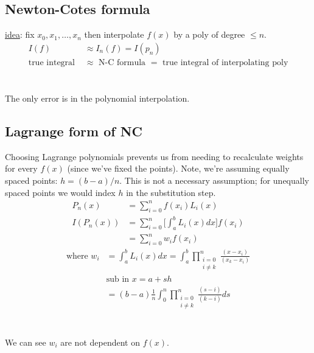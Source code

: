\documentclass[12pt]{exam}
\begin{document}
 
\subsection*{Newton-Cotes formula}
 
\underline{idea}: fix $x_0, x_1, \dots, x_n$ then interpolate $f(x)$ by a poly of degree $\leq n$.
%
\ifprintanswers
\begin{align*}
I(f) &\approx I_n(f) = I(p_n)\\
\text{true integral } &\approx \text{ N-C formula } = \text{ true integral of interpolating poly}
\end{align*}
\else
\\\vspace*{2em}\\
\fi
%
The only error is in the polynomial interpolation.

\subsection*{Lagrange form of NC}
Choosing Lagrange polynomials prevents us from needing to recalculate weights for every $f(x)$ (since we've fixed the points). Note, we're assuming equally spaced points: $h = (b-a)/n$. This is not a necessary assumption; for unequally spaced points we would index $h$ in the substitution step.
%
\begin{align*}
P_n(x) &= \sum_{i=0}^{n}f(x_i)L_i(x) \\
%
I(P_n(x)) &= \sum_{i=0}^{n} \bigl[ \int_a^b L_i(x)dx \bigr] f(x_i) \\
%
&= \sum_{i=0}^{n} w_i f(x_i)
\end{align*}
\ifprintanswers
\begin{align*}
\text{where } w_i &=  \int_a^b L_i(x)dx = \int_a^b \prod_{\substack{i=0\\ i \neq k}}^n \frac{(x-x_i)}{(x_k-x_i)} \\
&\text{sub in } x = a + sh\\
&=  (b-a)\frac{1}{n}\int_0^n \prod_{\substack{i=0\\ i \neq k}}^n \frac{(s-i)}{(k-i)}ds
\end{align*}
\else
\\\vspace*{4em}\\
\fi
We can see $w_i$ are not dependent on $f(x)$.

\end{document}
